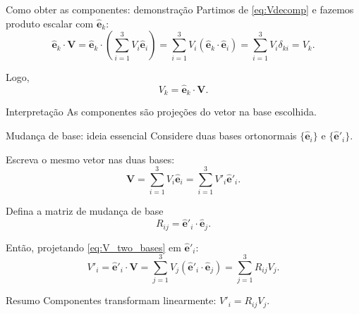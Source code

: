 \documentclass[aspectratio=169]{beamer}
\newcommand{\red}[1]{\textcolor{myred}{#1}}
\begin{document}
\begin{frame}{Como obter as componentes: demonstração}
Partimos de \eqref{eq:Vdecomp} e fazemos produto escalar com $\hat{\bm e}_k$:
\begin{equation}
\hat{\bm e}_k\cdot\bm V
=\hat{\bm e}_k\cdot\left(\sum_{i=1}^3 V_i\hat{\bm e}_i\right)
=\sum_{i=1}^3 V_i(\hat{\bm e}_k\cdot\hat{\bm e}_i)
=\sum_{i=1}^3 V_i\delta_{ki}
=V_k.
\label{eq:Vk_demo}
\end{equation}

Logo,
\begin{equation}
V_k=\hat{\bm e}_k\cdot \bm V.
\label{eq:Vk}
\end{equation}

\begin{alertblock}{Interpretação}
As componentes são \red{projeções} do vetor na base escolhida.
\end{alertblock}
\end{frame}

\begin{frame}{Mudança de base: ideia essencial}
Considere duas bases ortonormais $\{\hat{\bm e}_i\}$ e $\{\hat{\bm e}'_i\}$.

Escreva o mesmo vetor nas duas bases:
\begin{equation}
\bm V=\sum_{i=1}^3 V_i\hat{\bm e}_i
=\sum_{i=1}^3 V'_i\hat{\bm e}'_i.
\label{eq:V_two_bases}
\end{equation}

Defina a matriz de mudança de base
\begin{equation}
R_{ij}=\hat{\bm e}'_i\cdot\hat{\bm e}_j.
\label{eq:Rij}
\end{equation}

Então, projetando \eqref{eq:V_two_bases} em $\hat{\bm e}'_i$:
\begin{equation}
V'_i=\hat{\bm e}'_i\cdot\bm V
=\sum_{j=1}^3 V_j(\hat{\bm e}'_i\cdot\hat{\bm e}_j)
=\sum_{j=1}^3 R_{ij}V_j.
\label{eq:Vprime_RV}
\end{equation}

\begin{block}{Resumo}
\red{Componentes transformam linearmente:} $V'_i=R_{ij}V_j$.
\end{block}
\end{frame}
\end{document}
